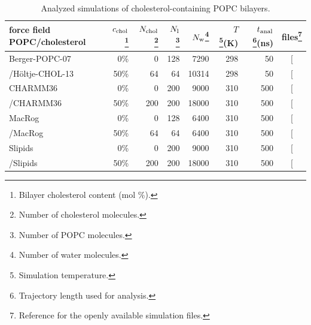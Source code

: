 \documentclass[journal=jcisd8,manuscript=article,layout=twocolumn]{achemso}
\begin{document}
\begin{table}[]
\caption{Analyzed simulations of cholesterol-containing POPC bilayers.}
\begin{minipage}[t]{\columnwidth}
\resizebox{\columnwidth}{!} {
\begin{tabular}{lrrrrrrc}
force field POPC/cholesterol &
$c_{{\rm chol}}$\footnote{Bilayer cholesterol content (mol \%).}  &
$N_{\rm chol}$\footnote{Number of cholesterol molecules.}  &
$N_{\rm l}$\footnote{Number of POPC molecules.} &
$N_{\rm w}$\footnote{Number of water molecules.}  &
$T$\footnote{Simulation temperature.}(K) &
$t_{{\rm anal}}$\footnote{Trajectory length used for analysis.}(ns) &
files\footnote{Reference for the openly available simulation files.} 
\tabularnewline
\hline 
Berger-POPC-07~\cite{ollila07a}
	& 0\%	& 0	& 128	& 7290  & 298  & 50 & {[}\!\!\citenum{bergerFILESpopc}{]} \tabularnewline
/H\"{o}ltje-CHOL-13~\cite{holtje01,ferreira13} 
	& 50\%	& 64	& 64		& 10314  & 298  & 50  & {[}\!\!\citenum{bergerFILESpopc50chol}{]} \tabularnewline[1.0ex]
CHARMM36~\cite{klauda10} 
	& 0\%	& 0 	& 200 	& 9000  & 310  & 500  & {[}\!\!\citenum{T310charmm36files}{]} \tabularnewline
/CHARMM36~\cite{lim12} 
 	& 50\%	& 200	& 200		& 18000  & 310  & 500  & {[}\!\!\citenum{T310charmm36files50perCHOL}{]} \tabularnewline[1.0ex]
MacRog~\cite{kulig15}
	& 0\%	& 0	& 128	& 6400  & 310  & 500  & {[}\!\!\citenum{macrogCHOLfiles}{]} \tabularnewline
/MacRog~\cite{kulig15}
 	& 50\%	& 64	& 64		& 6400  & 310  & 500  & {[}\!\!\citenum{macrogCHOLfiles}{]} \tabularnewline[1.0ex]
Slipids~\cite{jambeck12b}
	& 0\%	& 0	& 200	& 9000 & 310 & 500  & {[}\!\!\citenum{slipidsFILESpopcchol}{]} \tabularnewline
/Slipids~\cite{jambeck13chol}
 	& 50\%	&200& 200	& 18000 & 310 & 500 & {[}\!\!\citenum{slipidsFILESpopcchol}{]}\tabularnewline
\end{tabular}
}
\end{minipage}
\label{tab:chol}
\end{table}
\end{document}
